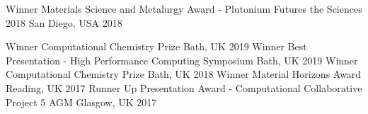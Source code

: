 \begin{cvhonors}
  \cvhonor
    {Winner}
    {Materials Science and Metalurgy Award - Plutonium Futures the Sciences 2018}
    {San Diego, USA}
    {2018}
\end{cvhonors}

\begin{cvhonors}
  \cvhonor
    {Winner}
    {Computational Chemistry Prize}
    {Bath, UK}
    {2019}
  \cvhonor
    {Winner}
    {Best Presentation - High Performance Computing Symposium}
    {Bath, UK}
    {2019}
  \cvhonor
    {Winner}
    {Computational Chemistry Prize}
    {Bath, UK}
    {2018}
   \cvhonor
    {Winner}
    {Material Horizons Award}
    {Reading, UK}
    {2017}
   \cvhonor
    {Runner Up}
    {Presentation Award - Computational Collaborative Project 5 AGM}
    {Glasgow, UK}
    {2017}
\end{cvhonors}
